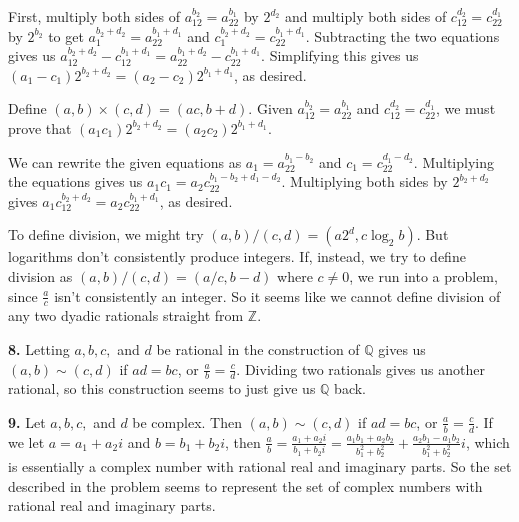 \documentclass{article}
\begin{document}
First, multiply both sides of $a_12^{b_2} = a_22^{b_1}$ by $2^{d_2}$ and multiply both sides of $c_12^{d_2} = c_22^{d_1}$ by $2^{b_2}$ to get $a_1^{b_2 + d_2} = a_22^{b_1 + d_1}$ and $c_1^{b_2 + d_2} = c_22^{b_1 + d_1}$. Subtracting the two equations gives us $a_12^{b_2 + d_2} - c_12^{b_1 + d_1} = a_22^{b_1 + d_2} - c_22^{b_1 + d_1}$. Simplifying this gives us $(a_1 - c_1)2^{b_2 + d_2} = (a_2 - c_2)2^{b_1 + d_1}$, as desired.
\newline

Define $(a, b) \times (c, d) = (ac, b + d)$. Given $a_12^{b_2} = a_22^{b_1}$ and $c_12^{d_2} = c_22^{d_1}$, we must prove that $(a_1c_1)2^{b_2 + d_2} = (a_2c_2)2^{b_1 + d_1}$.
\newline

We can rewrite the given equations as $a_1 = a_22^{b_1 - b_2}$ and $c_1 = c_22^{d_1 - d_2}$. Multiplying the equations gives us $a_1c_1 = a_2c_22^{b_1 - b_2 + d_1 - d_2}$. Multiplying both sides by $2^{b_2 + d_2}$ gives $a_1c_12^{b_2 + d_2} = a_2c_22^{b_1 + d_1}$, as desired.
\newline

To define division, we might try $(a, b)/(c, d) = (a2^d, c\log_2 b)$. But logarithms don't consistently produce integers. If, instead, we try to define division as $(a, b)/(c, d) = (a/c, b - d)$ where $c \neq 0$, we run into a problem, since $\frac{a}{c}$ isn't consistently an integer. So it seems like we cannot define division of any two dyadic rationals straight from $\mathbb{Z}$.
\newline

\textbf{8.} Letting $a, b, c,$ and $d$ be rational in the construction of $\mathbb{Q}$ gives us $(a, b) \sim (c, d)$ if $ad = bc$, or $\frac{a}{b} = \frac{c}{d}$. Dividing two rationals gives us another rational, so this construction seems to just give us $\mathbb{Q}$ back.
\newline

\textbf{9.} Let $a, b, c,$ and $d$ be complex. Then $(a, b) \sim (c, d)$ if $ad = bc$, or $\frac{a}{b} = \frac{c}{d}$. If we let $a = a_1 + a_2i$ and $b = b_1 + b_2i$, then $\frac{a}{b} = \frac{a_1 + a_2i}{b_1 + b_2i} = \frac{a_1b_1 + a_2b_2}{b_1^2 + b_2^2} + \frac{a_2b_1 - a_1b_2}{b_1^2 + b_2^2}i$, which is essentially a complex number with rational real and imaginary parts. So the set described in the problem seems to represent the set of complex numbers with rational real and imaginary parts.
\end{document}
